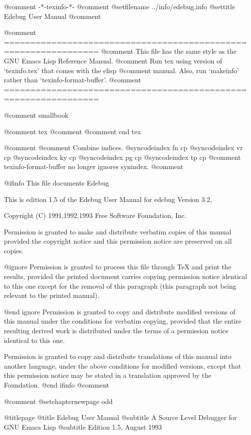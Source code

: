   @comment -*-texinfo-*-
@comment %
@setfilename ../info/edebug.info
@settitle Edebug User Manual
@comment %

@comment ================================================================
@comment This file has the same style as the GNU Emacs Lisp Reference Manual.
@comment Run tex using version of `texinfo.tex' that comes with the elisp
@comment manual. Also, run `makeinfo' rather than `texinfo-format-buffer'.
@comment ================================================================

@comment smallbook

@comment tex
@comment \overfullrule=0pt
@comment end tex

@comment
@comment Combine indices.
@syncodeindex fn cp
@syncodeindex vr cp
@syncodeindex ky cp
@syncodeindex pg cp
@syncodeindex tp cp
@comment texinfo-format-buffer no longer ignores synindex.
@comment

@ifinfo
This file documents Edebug

This is edition 1.5 of the Edebug User Manual
for edebug Version 3.2,

Copyright (C) 1991,1992,1993 Free Software Foundation, Inc.

Permission is granted to make and distribute verbatim copies of
this manual provided the copyright notice and this permission notice
are preserved on all copies.

@ignore
Permission is granted to process this file through TeX and print the
results, provided the printed document carries copying permission
notice identical to this one except for the removal of this paragraph
(this paragraph not being relevant to the printed manual).

@end ignore
Permission is granted to copy and distribute modified versions of this
manual under the conditions for verbatim copying, provided that the entire
resulting derived work is distributed under the terms of a permission
notice identical to this one.

Permission is granted to copy and distribute translations of this manual
into another language, under the above conditions for modified versions,
except that this permission notice may be stated in a translation approved
by the Foundation.
@end ifinfo
@comment

@comment
@setchapternewpage odd

@titlepage
@title Edebug User Manual
@subtitle A Source Level Debugger for GNU Emacs Lisp
@subtitle Edition 1.5, August 1993

